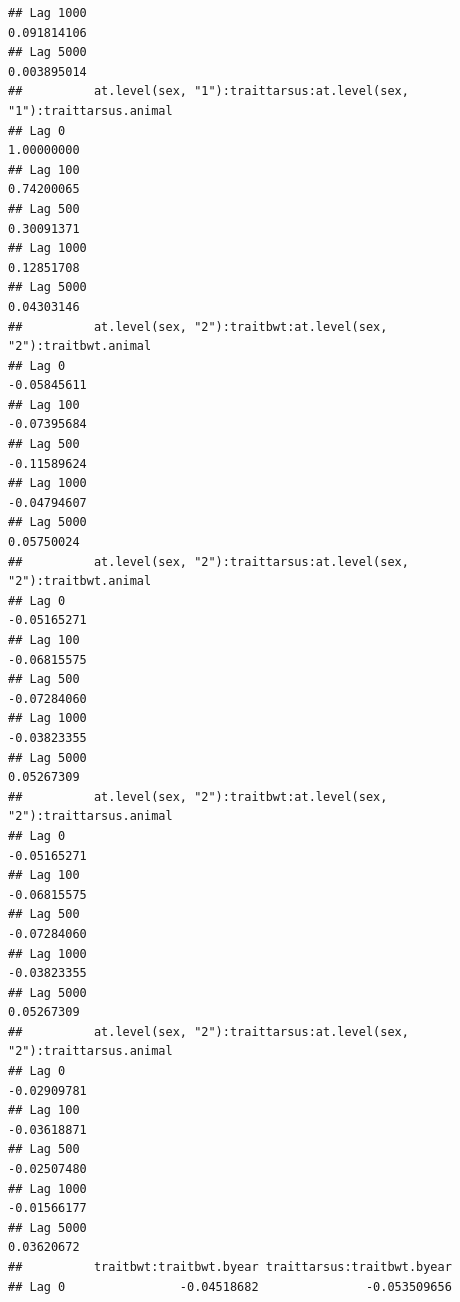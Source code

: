 \documentclass[
  12pt,
]{book}
\begin{document}
\begin{verbatim}
## Lag 1000                                                       0.091814106
## Lag 5000                                                       0.003895014
##          at.level(sex, "1"):traittarsus:at.level(sex, "1"):traittarsus.animal
## Lag 0                                                              1.00000000
## Lag 100                                                            0.74200065
## Lag 500                                                            0.30091371
## Lag 1000                                                           0.12851708
## Lag 5000                                                           0.04303146
##          at.level(sex, "2"):traitbwt:at.level(sex, "2"):traitbwt.animal
## Lag 0                                                       -0.05845611
## Lag 100                                                     -0.07395684
## Lag 500                                                     -0.11589624
## Lag 1000                                                    -0.04794607
## Lag 5000                                                     0.05750024
##          at.level(sex, "2"):traittarsus:at.level(sex, "2"):traitbwt.animal
## Lag 0                                                          -0.05165271
## Lag 100                                                        -0.06815575
## Lag 500                                                        -0.07284060
## Lag 1000                                                       -0.03823355
## Lag 5000                                                        0.05267309
##          at.level(sex, "2"):traitbwt:at.level(sex, "2"):traittarsus.animal
## Lag 0                                                          -0.05165271
## Lag 100                                                        -0.06815575
## Lag 500                                                        -0.07284060
## Lag 1000                                                       -0.03823355
## Lag 5000                                                        0.05267309
##          at.level(sex, "2"):traittarsus:at.level(sex, "2"):traittarsus.animal
## Lag 0                                                             -0.02909781
## Lag 100                                                           -0.03618871
## Lag 500                                                           -0.02507480
## Lag 1000                                                          -0.01566177
## Lag 5000                                                           0.03620672
##          traitbwt:traitbwt.byear traittarsus:traitbwt.byear
## Lag 0                -0.04518682               -0.053509656

\end{verbatim}
\end{document}
